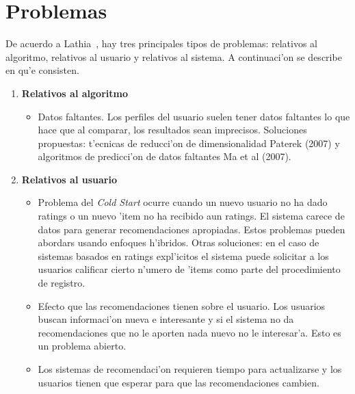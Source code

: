 \documentclass[11pt]{article}
\begin{document}


\section{Problemas}
De acuerdo a Lathia~\cite{recsys:nlathia}, hay tres principales tipos de problemas: relativos al algoritmo, relativos al usuario y relativos al sistema. A continuaci'on se describe en qu'e consisten.

\begin{enumerate}
\item \textbf{Relativos al algoritmo}

\begin{itemize}
\item Datos faltantes. Los perfiles del usuario suelen tener datos faltantes lo que hace que al comparar, los resultados sean imprecisos. Soluciones propuestas: t'ecnicas de reducci'on de dimensionalidad Paterek (2007) y algoritmos de predicci'on de datos faltantes Ma et al (2007).
\end{itemize}

\item \textbf{Relativos al usuario}
\begin{itemize}
\item Problema del \textit{Cold Start} ocurre cuando un nuevo usuario no ha dado ratings o un nuevo 'item no ha recibido aun ratings. El sistema carece de datos para generar recomendaciones apropiadas. Estos problemas pueden abordars usando enfoques h'ibridos. Otras soluciones: en el caso de sistemas basados en ratings expl'icitos el sistema puede solicitar a los usuarios calificar cierto n'umero de 'items como parte del procedimiento de registro.
\item Efecto que las recomendaciones tienen sobre el usuario. Los usuarios buscan informaci'on nueva e interesante y si el sistema no da recomendaciones que no le aporten nada nuevo no le interesar'a. Esto es un problema abierto. 
\item Los sistemas de recomendaci'on requieren tiempo para actualizarse y los usuarios tienen que esperar para que las recomendaciones cambien.
\end{itemize}


\end{enumerate}
\end{document}
